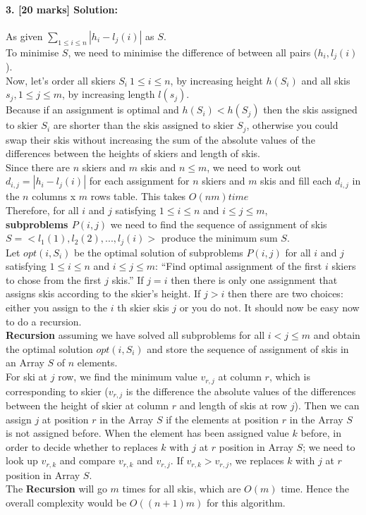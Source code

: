 \documentclass[a4paper]{scrartcl}
\begin{document}
\paragraph{3. [20 marks] Solution:}
\label{sec:Question3}
As given $\sum_{1\leq i \leq n} | h_i - l_j(i) | $ as $S$.\\
To minimise $S$, we need to minimise the difference of between all pairs ($h_i, l_j(i)$).\\
Now, let's order all skiers $S_i\ 1\leq i \leq n$, by increasing height $h(S_i)$ and all skis $s_j, 1\leq j \leq m$, by increasing length $l(s_j)$. \\
Because if an assignment is optimal and $h(S_i) < h(S_j)$ then the skis assigned to skier $S_i$ are shorter than the skis assigned to skier $S_j$, otherwise you could swap their skis without increasing the sum of the absolute values of the differences between the heights of skiers and length of skis.\\
Since there are $n$ skiers and $m$ skis and $n\leq m$, we need to work out $d_{i,j}=|h_i-l_j(i)|$ for each assignment for $n$ skiers and $m$ skis and fill each $d_{i,j}$ in the $n$ columns x $m$ rows table. This takes $O(nm) time$\\
Therefore, for all $i$ and $j$ satisfying $1 \leq i \leq n$ and $i \leq j \leq m$,\\
\textbf{subproblems $P(i, j)$} we need to find the sequence of assignment of skis $S=\big<l_1(1) ,l_2(2) ,...,l_j(i)\big>$ produce the minimum sum $S$.\\
Let $opt(i,S_{i})$ be the optimal solution of subproblems $P(i, j)$ for all $i$ and $j$ satisfying $1 \leq i \leq n$ and $i \leq j \leq m$: “Find optimal assignment of the first $i$ skiers to chose from the first $j$ skis.” If $j = i$ then there is only one assignment that assigns skis according to the skier’s height. If $j > i$ then there are two choices: either you assign to the $i$ th skier skis $j$ or you do not. It should now be easy now to do a recursion.\\
\textbf{Recursion} assuming we have solved all subproblems for all $ i < j \leq m$ and obtain the optimal solution $opt(i,S_{i})$ and store the sequence of assignment of skis in an Array $S$ of $n$ elements.\\
For ski at $j$ row, we find the minimum value $v_{r,j}$ at column $r$, which is corresponding to skier ($v_{r,j}$ is the difference the absolute values of the differences between the height of skier at column $r$ and length of skis at row $j$). Then we can assign $j$ at position $r$ in the Array $S$ if the elements at position $r$ in the Array $S$ is not assigned before. When the element has been assigned value $k$ before, in order to decide whether to replaces $k$ with $j$ at $r$ position in Array $S$; we need to look up $v_{r,k}$ and compare $v_{r,k}$ and $v_{r,j}$. If $v_{r,k}>v_{r,j}$, we replaces $k$ with $j$ at $r$ position in Array $S$.\\
The \textbf{Recursion} will go $m$ times for all skis, which are $O(m)$ time. Hence the overall complexity would be $O((n+1)m)$ for this algorithm.
\end{document}
